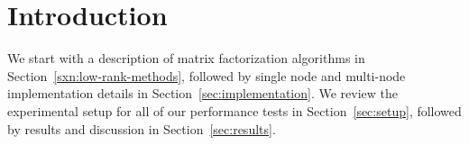 \section{Introduction}
\label{sec:intro}


We start with a description of matrix factorization algorithms in Section~\ref{sxn:low-rank-methods}, followed by single node and multi-node implementation details in Section~\ref{sec:implementation}. We review the experimental setup for all of our performance tests in Section~\ref{sec:setup}, followed by results and discussion in Section~\ref{sec:results}.

